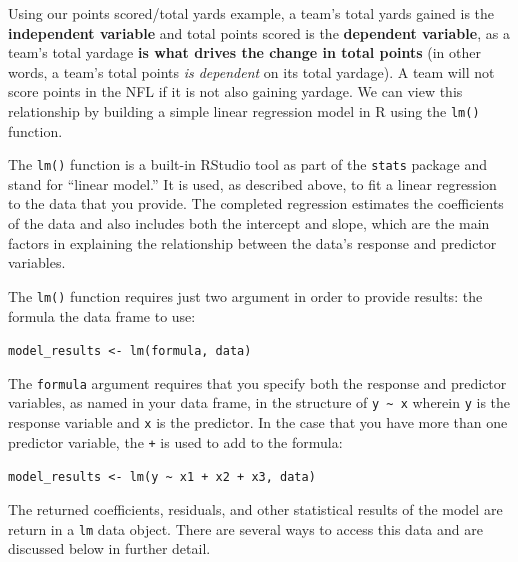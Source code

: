 \documentclass[
  letterpaper,
]{krantz}
\begin{document}
Using our points scored/total yards example, a team's total yards gained
is the \textbf{independent variable} and total points scored is the
\textbf{dependent variable}, as a team's total yardage \textbf{is what
drives the change in total points} (in other words, a team's total
points \emph{is dependent} on its total yardage). A team will not score
points in the NFL if it is not also gaining yardage. We can view this
relationship by building a simple linear regression model in R using the
\texttt{lm()} function.

\begin{tcolorbox}[enhanced jigsaw, colback=white, leftrule=.75mm, breakable, colframe=quarto-callout-note-color-frame, bottomtitle=1mm, rightrule=.15mm, left=2mm, opacityback=0, bottomrule=.15mm, arc=.35mm, coltitle=black, colbacktitle=quarto-callout-note-color!10!white, toptitle=1mm, titlerule=0mm, title=\textcolor{quarto-callout-note-color}{\faInfo}\hspace{0.5em}{Note}, toprule=.15mm, opacitybacktitle=0.6]

The \texttt{lm()} function is a built-in RStudio tool as part of the
\texttt{stats} package and stand for ``linear model.'' It is used, as
described above, to fit a linear regression to the data that you
provide. The completed regression estimates the coefficients of the data
and also includes both the intercept and slope, which are the main
factors in explaining the relationship between the data's response and
predictor variables.

The \texttt{lm()} function requires just two argument in order to
provide results: the formula the data frame to use:

\texttt{model\_results\ \textless{}-\ lm(formula,\ data)}

The \texttt{formula} argument requires that you specify both the
response and predictor variables, as named in your data frame, in the
structure of \texttt{y\ \textasciitilde{}\ x} wherein \texttt{y} is the
response variable and \texttt{x} is the predictor. In the case that you
have more than one predictor variable, the \texttt{+} is used to add to
the formula:

\texttt{model\_results\ \textless{}-\ lm(y\ \textasciitilde{}\ x1\ +\ x2\ +\ x3,\ data)}

The returned coefficients, residuals, and other statistical results of
the model are return in a \texttt{lm} data object. There are several
ways to access this data and are discussed below in further detail.

\end{tcolorbox}
\end{document}
